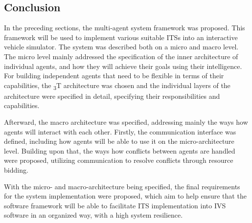 \documentclass[main.tex]{subfiles}
\begin{document}
\subsection{Conclusion}

In the preceding sections, the multi-agent system framework was proposed. This framework will be used to implement various 
suitable ITSs into an interactive vehicle simulator. The system was described both on a micro and macro level. The micro level 
mainly addressed the specification of the inner architecture of individual agents, and how they will achieve their goals using their 
intelligence. For building independent agents that need to be flexible in terms of their capabilities, the \textsubscript{3}T
architecture was chosen and the individual layers of the architecture were specified in detail, specifying their responsibilities
and capabilities. 

Afterward, the macro architecture was specified, addressing mainly the ways how agents will interact with each other. 
Firstly, the communication interface was defined, including how agents will be able to use it on the micro-architecture level.
Building upon that, the ways how conflicts between agents are handled were proposed, utilizing communication to resolve 
conflicts through resource bidding. 

With the micro- and macro-architecture being specified, the final requirements for the system implementation were proposed, 
which aim to help ensure that the software framework will be able to facilitate ITS implementation into IVS software in an 
organized way, with a high system resilience.

\clearpage
\end{document}
